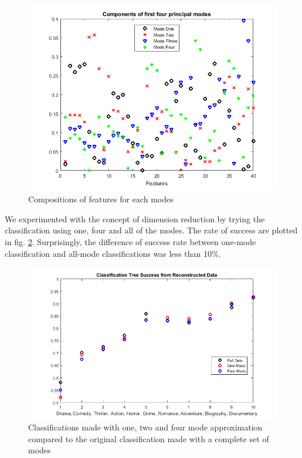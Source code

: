 \documentclass[letterpaper, 10 pt, conference]{ieeeconf}  %
\begin{document}
\begin{figure}[h]
	\centering
	\includegraphics[width=\columnwidth]{principalModes.png}
	\caption{Compositions of features for each modes}
	\label{f:mode_covar}
\end{figure}
We experimented with the concept of dimension reduction by trying the classification using one, four and all of the modes. The rate of success are plotted in fig. \ref{f:modal_redx}. Surprisingly, the difference of success rate between one-mode classification and all-mode classifications was less than 10\%.

\begin{figure}[h]
	\centering
	\includegraphics[width=\columnwidth]{reconstructionSuccess.png}
	\caption{Classifications made with one, two and four mode approximation compared to the original classification made with a complete set of modes} 
	\label{f:modal_redx}
\end{figure}
\end{document}
